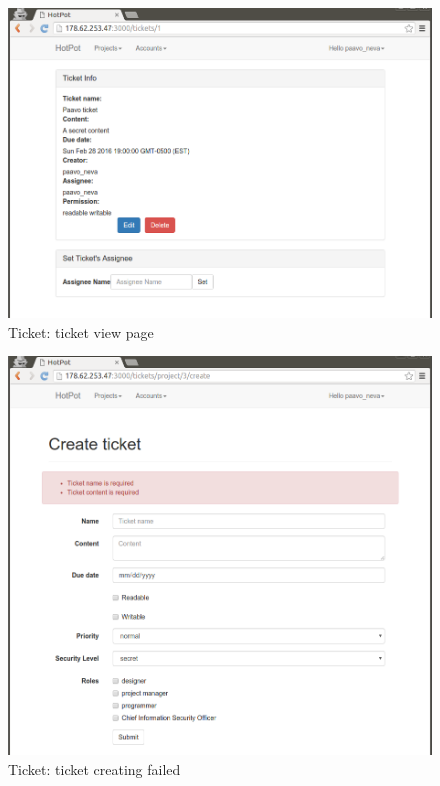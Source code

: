 \begin{figure}[bth]
\myfloatalign
\includegraphics[width=1.0\linewidth]{gfx/chapter_5/ticket/ticket_view}
\caption[Ticket: ticket view page]{Ticket: ticket view page}
\label{fig:user_guide:ticket:ticket_view}
\end{figure}

\begin{figure}[bth]
\myfloatalign
\includegraphics[width=1.0\linewidth]{gfx/chapter_5/ticket/ticket_create_failed}
\caption[Ticket: ticket create failed]{Ticket: ticket creating failed}
\label{fig:user_guide:ticket:ticket_create_failed}
\end{figure}

